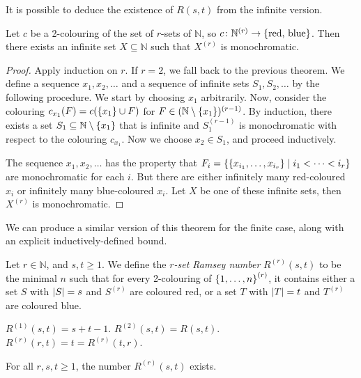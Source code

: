 \begin{remark}
	It is possible to deduce the existence of \( R(s,t) \) from the infinite version.
\end{remark}
\begin{theorem}
	Let \( c \) be a 2-colouring of the set of \( r \)-sets of \( \mathbb N \), so \( c \colon \mathbb N^{(r)} \to \qty{\text{red, blue}} \).
	Then there exists an infinite set \( X \subseteq \mathbb N \) such that \( X^{(r)} \) is monochromatic.
\end{theorem}
\begin{proof}
	Apply induction on \( r \).
	If \( r = 2 \), we fall back to the previous theorem.
	We define a sequence \( x_1, x_2, \dots \) and a sequence of infinite sets \( S_1, S_2, \dots \) by the following procedure.
	We start by choosing \( x_1 \) arbitrarily.
	Now, consider the colouring \( c_{x_1}(F) = c(\qty{x_1} \cup F) \) for \( F \in (\mathbb N \setminus \qty{x_1})^{(r-1)} \).
	By induction, there exists a set \( S_1 \subseteq \mathbb N \setminus \qty{x_1} \) that is infinite and \( S_1^{(r-1)} \) is monochromatic with respect to the colouring \( c_{x_1} \).
	Now we choose \( x_2 \in S_1 \), and proceed inductively.

	The sequence \( x_1, x_2, \dots \) has the property that \( F_i = \qty{\qty{x_{i_1}, \dots, x_{i_r}} \mid i_1 < \dots < i_r} \) are monochromatic for each \( i \).
	But there are either infinitely many red-coloured \( x_i \) or infinitely many blue-coloured \( x_i \).
	Let \( X \) be one of these infinite sets, then \( X^{(r)} \) is monochromatic.
\end{proof}
We can produce a similar version of this theorem for the finite case, along with an explicit inductively-defined bound.
\begin{definition}
	Let \( r \in \mathbb N \), and \( s, t \geq 1 \).
	We define the \emph{\( r \)-set Ramsey number} \( R^{(r)}(s,t) \) to be the minimal \( n \) such that for every 2-colouring of \( \qty{1, \dots, n}^{(r)} \), it contains either a set \( S \) with \( \abs{S} = s \) and \( S^{(r)} \) are coloured red, or a set \( T \) with \( \abs{T} = t \) and \( T^{(r)} \) are coloured blue.
\end{definition}
\begin{remark}
	\( R^{(1)}(s,t) = s + t - 1 \).
	\( R^{(2)}(s,t) = R(s,t) \).
	\( R^{(r)}(r,t) = t = R^{(r)}(t,r) \).
\end{remark}
\begin{theorem}
	For all \( r, s, t \geq 1 \), the number \( R^{(r)}(s,t) \) exists.
\end{theorem}

